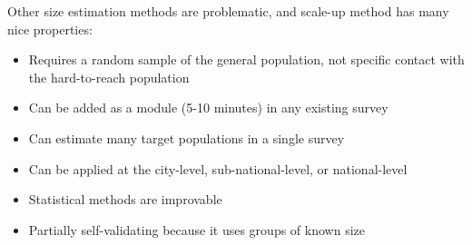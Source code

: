 \documentclass[aspectratio=169]{beamer}
\begin{document}
\begin{frame}

Other size estimation methods are problematic, and scale-up method has many nice properties:
\begin{itemize}
\item Requires a random sample of the general population, not specific contact with the hard-to-reach population \pause
\item Can be added as a module (5-10 minutes) in any existing survey \pause
\item Can estimate many target populations in a single survey \pause
\item Can be applied at the city-level, sub-national-level, or national-level \pause
\item Statistical methods are improvable \pause
\item Partially self-validating because it uses groups of known size
\end{itemize}

\end{frame}
\begin{frame}

\begin{figure}
  \centering
  \hspace{0.0in}
  \hspace{0.0in}
\end{figure}

\end{frame}
\end{document}
